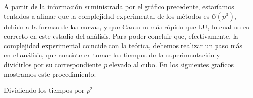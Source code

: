 A partir de la información suministrada por el gráfico precedente, estaríamos tentados a afimar que la complejidad experimental de los métodos es $\mathcal{O}(p^3)$,
debido a la formas de las curvas, y que Gauss es más rápido que LU, lo cual no es correcto en este estadio del análisis. Para poder concluir que, efectivamente, la complejidad experimental coincide con
la teórica, debemos realizar un paso más en el análisis, que consiste en tomar los tiempos de la experimentación y dividirlos por su correspondiente $p$ elevado al cubo.
\newline
\newline
En los siguientes graficos mostramos este procedimiento:
\begin{center}

    \caption{Dividiendo los tiempos por $p^2$}
\end{center}

